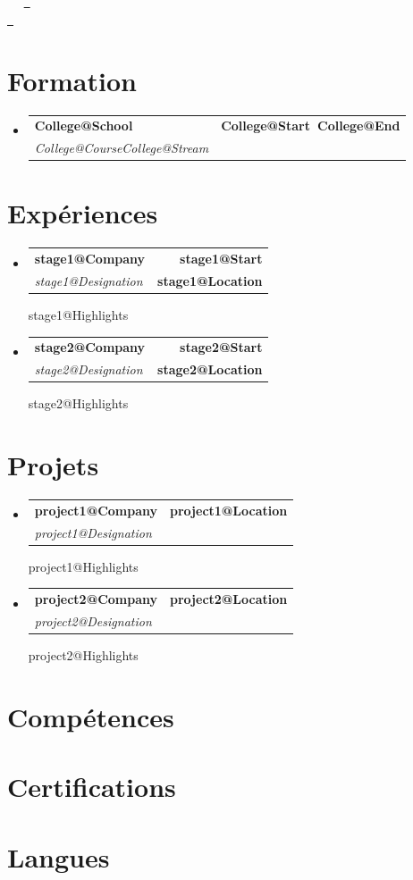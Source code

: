 \documentclass[letterpaper,11pt]{article}
\makeatletter
\newcommand{\resumeSubheading}[4]{
  \vspace{-2pt}\item
    \begin{tabular*}{1.0\textwidth}[t]{l@{\extracolsep{\fill}}r}
      \textbf{#1} & \textbf{\small #2} \\
      \textit{\small#3} & \textbf{\small #4} \\
    \end{tabular*}\vspace{-7pt}
}
\newcommand{\resumeSubHeadingListStart}{\begin{itemize}[leftmargin=0.0in, label={}]}
\newcommand{\resumeSubHeadingListEnd}{\end{itemize}}
\def\titlesection{
\begin{center}
    {\Huge \scshape \firstname \ \lastname} \\ \vspace{2pt}
    \normalsize \textit{\role} \\ \vspace{2pt}
    \small \raisebox{-0.1\height}\faPhone\ \jasphone ~ \href{mailto:\email}{\raisebox{-0.2\height}\faEnvelope\  \underline{\email}} \\
    \href{\linkedin}{\raisebox{-0.2\height}\faLinkedin\ \underline{\linkedin}}
    \vspace{-8pt}
\end{center}
}
\newcommand{\renderExp}[1]{
  \resumeSubheading
      {\csname #1@Company\endcsname}{\csname #1@Location\endcsname}
      {\csname #1@Designation\endcsname}{}
  \csname #1@Highlights\endcsname
}
\newcommand{\renderStage}[1]{
  \resumeSubheading
      {\csname #1@Company\endcsname}{\csname #1@Start\endcsname}
      {\csname #1@Designation\endcsname}{\csname #1@Location\endcsname}
  \csname #1@Highlights\endcsname
}
\makeatother
\begin{document}
\titlesection

\vspace{1em}

\section{Formation}
  \resumeSubHeadingListStart
      \resumeSubheading{\csname College@School\endcsname}
      {\csname College@Start\endcsname \ \csname College@End\endcsname}
      {\csname College@Course\endcsname \csname College@Stream\endcsname}{}
  \resumeSubHeadingListEnd

\section{Expériences}
  \resumeSubHeadingListStart
    \renderStage{stage1}
    \renderStage{stage2}
  \resumeSubHeadingListEnd

\section{Projets}
  \resumeSubHeadingListStart
    \renderExp{project1}
    \renderExp{project2}
  \resumeSubHeadingListEnd

\section{Compétences}
\skills

\section{Certifications}
\certifications

\section{Langues}
\langs
\end{document}
